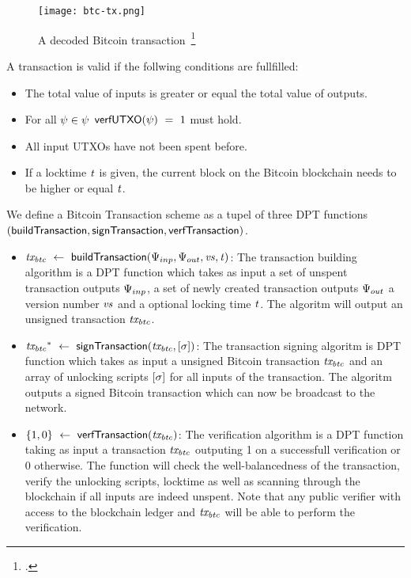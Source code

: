 \begin{figure}
    \begin{center}
        \texttt{[image: btc-tx.png]}
    \end{center}
    \caption{A decoded Bitcoin transaction~\footcite{https://github.com/bitcoinbook/bitcoinbook/blob/develop/ch06.asciidoc} \label{fig:btc-tx}}
\end{figure}

A transaction is valid if the follwing conditions are fullfilled:

\begin{itemize}
    \item The total value of inputs is greater or equal the total value of outputs.
    \item For all $\psi \in \psi$ $\mathsf{verfUTXO}(\psi) ~=~ 1$ must hold.
    \item All input UTXOs have not been spent before.
    \item If a locktime $\mathit{t}$ is given, the current block on the Bitcoin blockchain needs to be higher or equal $\mathit{t}$.
\end{itemize}

\begin{definition}
    We define a Bitcoin Transaction scheme as a tupel of three DPT functions $(\mathsf{buildTransaction},
    \mathsf{signTransaction}, \mathsf{verfTransaction})$.
    \begin{itemize}
        \item $\mathit{tx_{btc}} ~\leftarrow~ \mathsf{buildTransaction}(\Psi_{inp},\Psi_{out},\mathit{vs},\mathit{t})$: The
        transaction building algorithm is a DPT function which takes as input a set of unspent transaction outputs
        $\Psi_{inp}$, a set of newly created transaction outputs $\Psi_{out}$ a version number $\mathit{vs}$
        and a optional locking time $\mathit{t}$. The algoritm will output an unsigned transaction $\mathit{tx_{btc}}$.
        \item $\mathit{tx_{btc}}^* ~\leftarrow~ \mathsf{signTransaction} (\mathit{tx_{btc}},[\mathit{\sigma}])$: The transaction
        signing algoritm is DPT function which takes as input a unsigned Bitcoin transaction $\mathit{tx_{btc}}$ and an array
        of unlocking scripts $[\mathit{\sigma}]$ for all inputs of the transaction. The algoritm outputs a
        signed Bitcoin transaction which can now be broadcast to the network.
        \item $\{ 1,0 \} ~\leftarrow~ \mathsf{verfTransaction}(\mathit{tx_{btc}})$: The verification algorithm is a DPT function
        taking as input a transaction $\mathit{tx_{btc}}$ outputing 1 on a successfull verification or 0 otherwise. The
        function will check the well-balancedness of the transaction, verify the unlocking scripts, locktime
        as well as scanning through the blockchain if all inputs are indeed unspent.
        Note that any public verifier with access to the blockchain ledger and $\mathit{tx_{btc}}$ will be able to perform the verification.
    \end{itemize}
\end{definition}

